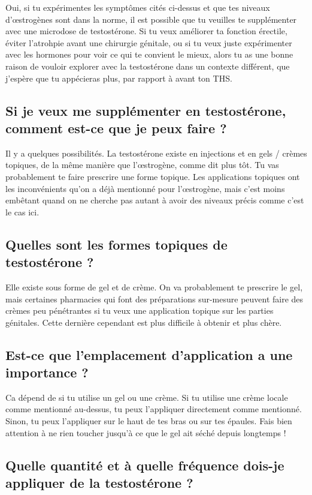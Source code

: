 \documentclass{article}
\begin{document}
Oui, si tu expérimentes les symptômes cités ci-dessus et que tes niveaux d'œstrogènes sont dans la norme, il est possible que tu veuilles te supplémenter avec une microdose de testostérone. Si tu veux améliorer ta fonction érectile, éviter l'atrohpie avant une chirurgie génitale, ou si tu veux juste expérimenter avec les hormones pour voir ce qui te convient le mieux, alors tu as une bonne raison de vouloir explorer avec la testostérone dans un contexte différent, que j'espère que tu appécieras plus, par rapport à avant ton THS.

\subsection{Si je veux me supplémenter en testostérone, comment est-ce que je peux faire ?}

Il y a quelques possibilités. La testostérone existe en injections et en gels / crèmes topiques, de la même manière que l'œstrogène, comme dit plus tôt. Tu vas probablement te faire prescrire une forme topique. Les applications topiques ont les inconvénients qu'on a déjà mentionné pour l'œstrogène, mais c'est moins embêtant quand on ne cherche pas autant à avoir des niveaux précis comme c'est le cas ici.

\subsection{Quelles sont les formes topiques de testostérone ?}

Elle existe sous forme de gel et de crème. On va probablement te prescrire le gel, mais certaines pharmacies qui font des préparations sur-mesure peuvent faire des crèmes peu pénétrantes si tu veux une application topique sur les parties génitales. Cette dernière cependant est plus difficile à obtenir et plus chère.

\subsection{Est-ce que l'emplacement d'application a une importance ?}

Ca dépend de si tu utilise un gel ou une crème. Si tu utilise une crème locale comme mentionné au-dessus, tu peux l'appliquer directement comme mentionné. Sinon, tu peux l'appliquer sur le haut de tes bras ou sur tes épaules. Fais bien attention à ne rien toucher jusqu'à ce que le gel ait séché depuis longtemps !

\subsection{Quelle quantité et à quelle fréquence dois-je appliquer de la testostérone ?}
\end{document}
